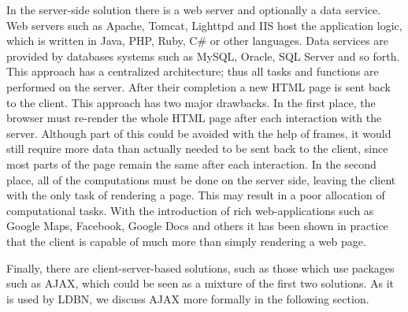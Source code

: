 In the server-side solution there is a web server and optionally a data service. 
Web servers such as Apache, Tomcat, Lighttpd and IIS host the application 
logic, which is written in Java, PHP, Ruby, C\# or other languages. 
Data services are provided by databases systems such as MySQL, Oracle, SQL Server and 
so forth. This approach has a centralized architecture; thus all tasks and 
functions are performed on the server. After their completion a new HTML page is 
sent back to the client. This approach has two major drawbacks. In the first place, 
the browser must re-render the whole HTML page after each interaction with the server.
Although part of this could be avoided with the help of frames, it would still 
require more data than actually needed to be sent back to the client, since most 
parts of the page remain the same after each interaction. In the second place, 
all of the computations must be done on the server side, leaving the client with 
the only task of rendering a page. This may result in a poor allocation of computational tasks. 
With the introduction of rich web-applications such as Google Maps, Facebook, 
Google Docs and others it has been shown in practice that the client is capable of 
much more than simply rendering a web page. 

Finally, there are client-server-based solutions, such as those
which use packages such as AJAX, which could be
seen as a mixture 
of the first two solutions. As it is used by LDBN, we
discuss AJAX more formally in the following section.

